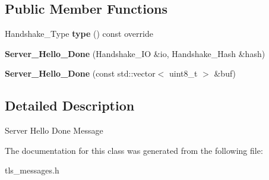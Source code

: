\subsection*{Public Member Functions}
\begin{DoxyCompactItemize}
\item 
\mbox{\label{class_botan_1_1_t_l_s_1_1_server___hello___done_a9e19242670ce54f66d015beff66b8aec}} 
Handshake\+\_\+\+Type {\bfseries type} () const override
\item 
\mbox{\label{class_botan_1_1_t_l_s_1_1_server___hello___done_afe86cca5a2e6aa673a3a60b3e82ca505}} 
{\bfseries Server\+\_\+\+Hello\+\_\+\+Done} (Handshake\+\_\+\+IO \&io, Handshake\+\_\+\+Hash \&hash)
\item 
\mbox{\label{class_botan_1_1_t_l_s_1_1_server___hello___done_a5c4e97e6f3131bce3ff6ac2e12a44af2}} 
{\bfseries Server\+\_\+\+Hello\+\_\+\+Done} (const std\+::vector$<$ uint8\+\_\+t $>$ \&buf)
\end{DoxyCompactItemize}


\subsection{Detailed Description}
Server Hello Done Message 

The documentation for this class was generated from the following file\+:\begin{DoxyCompactItemize}
\item 
tls\+\_\+messages.\+h\end{DoxyCompactItemize}
